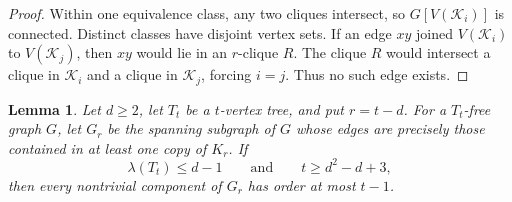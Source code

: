 \documentclass[11pt,a4paper]{article}
\newtheorem{lemma}[theorem]{Lemma}
\newcommand{\cl}{\mathcal K}
\begin{document}
\begin{proof}
Within one equivalence class, any two cliques intersect, so \(G[V(\cl_i)]\) is connected. Distinct classes have disjoint vertex sets. If an edge \(xy\) joined \(V(\cl_i)\) to \(V(\cl_j)\), then \(xy\) would lie in an \(r\)-clique \(R\). The clique \(R\) would intersect a clique in \(\cl_i\) and a clique in \(\cl_j\), forcing \(i=j\). Thus no such edge exists.
\end{proof}

\begin{lemma}\label{component-bound}
Let $d\ge2$, let $T_t$ be a $t$-vertex tree, and put $r=t-d$. For a $T_t$-free graph $G$, let $G_r$ be the spanning subgraph of $G$ whose edges are precisely those contained in at least one copy of $K_r$. If
\[
\lambda(T_t)\le d-1
\qquad\text{and}\qquad
 t\ge d^2-d+3,
\]
then every nontrivial component of $G_r$ has order at most $t-1$.
\end{lemma}
\end{document}
